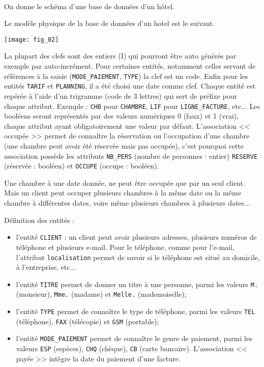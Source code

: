 \exer{[hotel]}
\setcounter{numques}{0}~\\

On donne le schéma d’une base de données d’un hôtel.

Le modèle physique de la base de données d'un hotel est le suivant.

\begin{center}
\texttt{[image: fig\_02]}
\end{center}


La plupart des clefs sont des entiers (I) qui pourront être auto générés par exemple par auto-incrément. Pour certaines entités, notamment celles servant de références à la saisie (\texttt{MODE\_PAIEMENT}, \texttt{TYPE}) la clef est un code. Enfin pour les entités \texttt{TARIF} et \texttt{PLANNING}, il a été choisi une date comme clef. Chaque entité est repérée à l'aide d'un trigramme (code de 3 lettres) qui sert de préfixe pour chaque attribut. Exemple : \texttt{CHB} pour \texttt{CHAMBRE}, \texttt{LIF} pour \texttt{LIGNE\_FACTURE}, etc... Les booléens seront représentés par des valeurs numériques 0 (faux) et 1 (vrai), chaque attribut ayant obligatoirement une valeur par défaut. L'association << occupée >> permet de connaître la réservation ou l'occupation d'une chambre (une chambre peut avoir été réservée mais pas occupée), c'est pourquoi cette association possède les attributs \texttt{NB\_PERS} (nombre de personnes : entier) \texttt{RESERVE} (réservée : booléen) et \texttt{OCCUPE} (occupe : booléen). 

Une chambre à une date donnée, ne peut être occupée que par un seul client. Mais un client peut occuper plusieurs chambres à la même date ou la même chambre à différentes dates, voire même plusieurs chambres à plusieurs dates...


Définition des entités :
\begin{itemize}
\item l'entité \texttt{CLIENT} : un client peut avoir plusieurs adresses, plusieurs numéros de téléphone et plusieurs e-mail. Pour le téléphone, comme pour l'e-mail, l'attribut \texttt{localisation} permet de savoir si le téléphone est situé au domicile, à l'entreprise, etc...
\item l'entité \texttt{TITRE} permet de donner un titre à une personne, parmi les valeurs \texttt{M.} (monsieur), \texttt{Mme.} (madame) et \texttt{Melle.} (mademoiselle);
\item l'entité \texttt{TYPE} permet de connaître le type de téléphone, parmi les valeurs \texttt{TEL} (téléphone), \texttt{FAX} (télécopie) et \texttt{GSM} (portable);
\item l'entité \texttt{MODE\_PAIEMENT} permet de connaître le genre de paiement, parmi les valeurs \texttt{ESP} (espèces), \texttt{CHQ} (chèque), \texttt{CB} (carte bancaire). L'association << payée >> intègre la date du paiement d'une facture.
\end{itemize}

